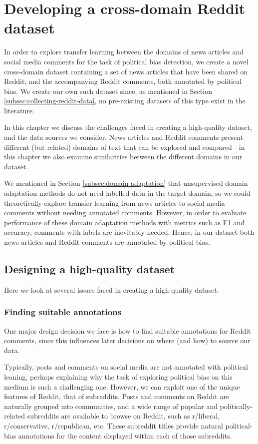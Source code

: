 \chapter{Developing a cross-domain Reddit dataset} \label{chap:reddit-data}

In order to explore transfer learning between the domains of news articles and social media comments for the task of political bias detection, we create a novel cross-domain dataset containing a set of news articles that have been shared on Reddit, and the accompanying Reddit comments, both annotated by political bias. We create our own such dataset since, as mentioned in Section \ref{subsec:collecting-reddit-data}, no pre-existing datasets of this type exist in the literature.

In this chapter we discuss the challenges faced in creating a high-quality dataset, and the data sources we consider. News articles and Reddit comments present different (but related) domains of text that can be explored and compared - in this chapter we also examine similarities between the different domains in our dataset.

We mentioned in Section \ref{subsec:domain-adaptation} that unsupervised domain adaptation methods do not need labelled data in the target domain, so we could theoretically explore transfer learning from news articles to social media comments without needing annotated comments. However, in order to evaluate performance of these domain adaptation methods with metrics such as F1 and accuracy, comments with labels are inevitably needed. Hence, in our dataset both news articles and Reddit comments are annotated by political bias.

\section{Designing a high-quality dataset}

Here we look at several issues faced in creating a high-quality dataset.

\subsection{Finding suitable annotations} \label{subsec:annotations}

One major design decision we face is how to find suitable annotations for Reddit comments, since this influences later decisions on where (and how) to source our data.

Typically, posts and comments on social media are not annotated with political leaning, perhaps explaining why the task of exploring political bias on this medium is such a challenging one. However, we can exploit one of the unique features of Reddit, that of subreddits. Posts and comments on Reddit are naturally grouped into communities, and a wide range of popular and politically-related subreddits are available to browse on Reddit, such as r/liberal, r/conservative, r/republican, etc. These subreddit titles provide natural political-bias annotations for the content displayed within each of those subreddits.

